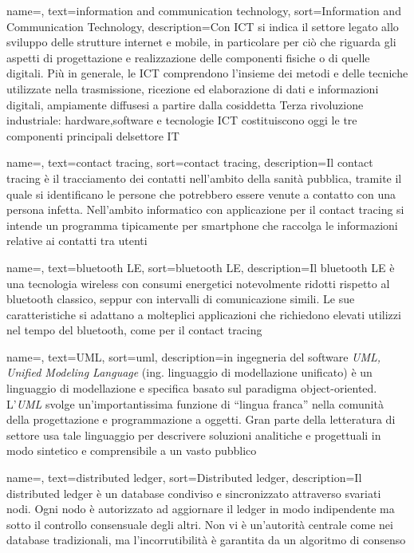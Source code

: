 {
    name=,
    text=information and communication technology,
    sort=Information and Communication Technology,
    description={Con ICT si indica il settore legato allo sviluppo delle strutture internet e
mobile, in particolare per ciò che riguarda gli aspetti di progettazione e realizzazione delle
componenti fisiche o di quelle digitali. Più in generale, le ICT comprendono l’insieme
dei metodi e delle tecniche utilizzate nella trasmissione, ricezione ed elaborazione di dati
e informazioni digitali, ampiamente diffusesi a partire dalla cosiddetta Terza rivoluzione
industriale: hardware,software e tecnologie ICT costituiscono oggi le tre componenti
principali delsettore IT}
}

{
    name=,
    text=contact tracing,
    sort=contact tracing,
    description={Il contact tracing è il tracciamento dei contatti nell'ambito della sanità pubblica, tramite il quale si identificano le persone che potrebbero essere venute a contatto con una persona infetta. Nell'ambito informatico con applicazione per il contact tracing si intende un programma tipicamente per smartphone che raccolga le informazioni relative ai contatti tra utenti}
}

{
    name=,
    text=bluetooth LE,
    sort=bluetooth LE,
    description={Il bluetooth LE è una tecnologia wireless con consumi energetici notevolmente ridotti rispetto al bluetooth classico, seppur con intervalli di comunicazione simili. Le sue caratteristiche si adattano a molteplici applicazioni che richiedono elevati utilizzi nel tempo del bluetooth, come per il contact tracing}
}

{
    name=,
    text=UML,
    sort=uml,
    description={in ingegneria del software \emph{UML, Unified Modeling Language} (ing. linguaggio di modellazione unificato) è un linguaggio di modellazione e specifica basato sul paradigma object-oriented. L'\emph{UML} svolge un'importantissima funzione di ``lingua franca'' nella comunità della progettazione e programmazione a oggetti. Gran parte della letteratura di settore usa tale linguaggio per descrivere soluzioni analitiche e progettuali in modo sintetico e comprensibile a un vasto pubblico}
}

{
    name=,
    text=distributed ledger,
    sort=Distributed ledger,
    description={Il distributed ledger è un database condiviso e sincronizzato attraverso svariati nodi. Ogni nodo è autorizzato ad aggiornare il ledger in modo indipendente ma sotto il controllo consensuale degli altri. Non vi è un'autorità centrale come nei database tradizionali, ma l'incorrutibilità è garantita da un algoritmo di consenso}
}

